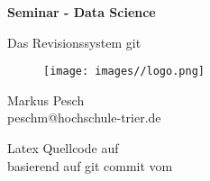\begin{titlepage}
	\begin{center}
		
		\begin{huge}
			\begin{singlespace}
				\textbf{Seminar - Data Science}
			\end{singlespace}
		\end{huge}
		
		\vspace{1.2cm}
		
		\begin{Large}
			Das Revisionssystem git
		\end{Large}
		
		\vspace{0.5cm}
		
		\begin{figure}[h]
			\centering
			\texttt{[image: images//logo.png]}
			\label{img:fh-trier-logo}
		\end{figure}
		
		\vspace{1.5cm}
		
		\begin{large}
			Markus Pesch\\
			peschm@hochschule-trier.de
		\end{large}
		
		\vspace{2cm}
		
		Latex Quellcode auf  \\
		basierend auf git commit  vom 
		
	\end{center}
\end{titlepage}
